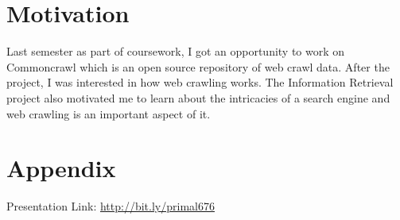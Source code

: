 \documentclass[a4paper, 11pt]{article} %
\begin{document}
\section*{Motivation}

Last semester as part of coursework, I got an opportunity to work on Commoncrawl \cite{commoncrawl2012} which is an open source repository of web crawl data. After the project, I was interested in how web crawling works. The Information Retrieval project also motivated me to learn about the intricacies of a search engine and web crawling is an important aspect of it.

\section*{Appendix}

Presentation Link: \url{http://bit.ly/primal676}







\end{document}
